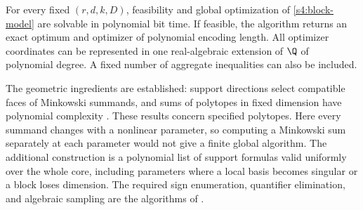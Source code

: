 \begin{theorem}
\label{s4:fixed-core}
For every fixed $(r,d,k,D)$, feasibility and global optimization of
\eqref{s4:block-model} are solvable in polynomial bit time. If feasible,
the algorithm returns an exact optimum and optimizer of polynomial
encoding length. All optimizer coordinates can be represented in one
real-algebraic extension of $\Q$ of polynomial degree. A fixed number
of aggregate inequalities can also be included.
\end{theorem}

The geometric ingredients are established: support directions select
compatible faces of Minkowski summands, and sums of polytopes in fixed
dimension have polynomial complexity
\citep{s4:gritzmann1993,s4:fukuda2004}. These results concern specified
polytopes. Here every summand changes with a nonlinear parameter, so
computing a Minkowski sum separately at each parameter would not give
a finite global algorithm. The additional construction is a polynomial
list of support formulas valid uniformly over the whole core, including
parameters where a local basis becomes singular or a block loses
dimension. The required sign enumeration, quantifier elimination, and
algebraic sampling are the algorithms of
\citet[Theorem~1.3.1 and Sections~3.1.3--3.2]
{basu1996-on-the-combinatorial-and-algebraic}.

